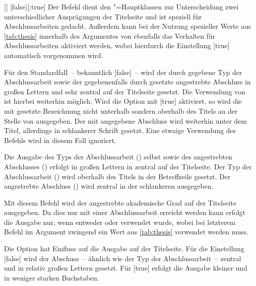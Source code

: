 \begin{Declaration}{[\PBoolean]}%
  [false][:true]
\printdeclarationlist%
%
Der Befehl  dient den \TUDScript"=Hauptklassen zur Unterscheidung 
zwei unterschiedlicher Ausprägungen der Titelseite und ist speziell für 
Abschlussarbeiten gedacht. Außerdem kann bei der Nutzung spezieller Werte 
aus \autoref{tab:thesis} innerhalb des Argumentes von  ebenfalls 
das Verhalten für Abschlussarbeiten aktiviert werden, wobei hierdurch die 
Einstellung [true] automatisch vorgenommen wird.

Für den Standardfall~-- bekanntlich [false]~-- wird der 
durch  gegebene Typ der Abschlussarbeit sowie der gegebenenfalls 
durch  gesetzte angestrebte Abschluss in großen Lettern und 
sehr zentral auf der Titelseite gesetzt. Die Verwendung von  ist 
hierbei weiterhin möglich.
%
Wird die Option mit [true] aktiviert, so wird die mit 
 gesetzte Bezeichnung nicht unterhalb sondern oberhalb des Titels 
an der Stelle von  ausgegeben. Der mit  
angegebene Abschluss wird weiterhin unter dem Titel, allerdings in schlankerer 
Schrift gesetzt. Eine etwaige Verwendung des Befehls  wird in 
diesem Fall ignoriert.
%
\begin{values}
\itemfalse
  Die Ausgabe des Typs der Abschlussarbeit () selbst sowie des 
  angestrebten Abschlusses () erfolgt in großen Lettern in 
  \DIN zentral auf der Titelseite.
\itemtrue*
  Der Typ der Abschlussarbeit () wird oberhalb des Titels in der 
  Betreffzeile gesetzt. Der angestrebte Abschluss () wird 
  zentral in der schlankeren \Univers ausgegeben.
\end{values}
\end{Declaration}

\begin{Declaration}[v2.02]{}
\printdeclarationlist%
%
%
Mit diesem Befehl wird der angestrebte akademische Grad auf der Titelseite 
ausgegeben. Da dies nur mit einer Abschlussarbeit erreicht werden kann erfolgt 
die Ausgabe nur, wenn entweder  oder  verwendet 
wurde, wobei bei letzterem Befehl im Argument zwingend ein Wert aus 
\autoref{tab:thesis} verwendet werden muss.

Die Option  hat Einfluss auf die Ausgabe auf der 
Titelseite. Für die Einstellung [false] wird der 
Abschuss~-- ähnlich wie 
der Typ der Abschlussarbeit~-- zentral und in relativ großen Lettern gesetzt. 
Für [true] erfolgt die Ausgabe kleiner und in weniger 
starken Buchstaben.
\end{Declaration}

